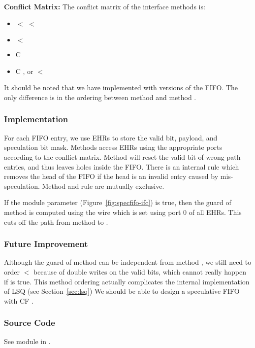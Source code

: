 \noindent\textbf{Conflict Matrix:}
The conflict matrix of the interface methods is:
\begin{itemize}
    \item {} $<$  $<$ 
    \item {} $<$ 
    \item {} C 
    \item {} C , or  $<$ 
\end{itemize}
It should be noted that we have implemented with versions of the FIFO.
The only difference is in the ordering between method  and  method .

\subsubsection{Implementation}
For each FIFO entry, we use EHRs to store the valid bit, payload, and speculation bit mask.
Methods access EHRs using the appropriate ports according to the conflict matrix.
Method  will reset the valid bit of wrong-path entries, and thus leaves holes inside the FIFO.
There is an internal rule  which removes the head of the FIFO if the head is an invalid entry caused by mis-speculation.
Method  and rule  are mutually exclusive.

If the module parameter  (Figure~\ref{fig:specfifo-ifc}) is true, then the guard of method  is computed using the wire which is set using port 0 of all EHRs.
This cuts off the path from method  to .

\subsubsection{Future Improvement}
Although the guard of method  can be independent from method , we still need to order  $<$  because of double writes on the valid bits, which cannot really happen if  is true.
This method ordering actually complicates the internal implementation of LSQ (see Section~\ref{sec:lsq})
We should be able to design a speculative FIFO with  CF .

\subsubsection{Source Code}
See module  in .
